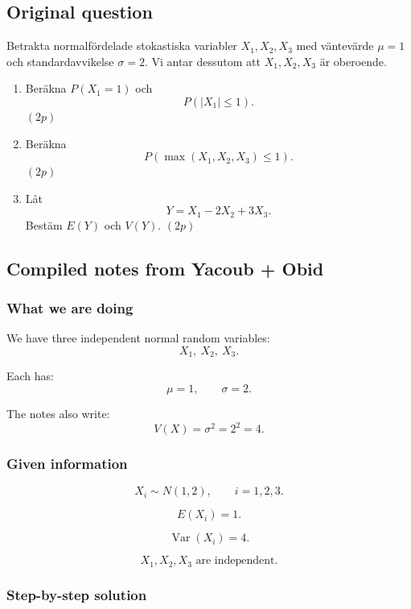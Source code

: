 \documentclass[10pt]{article}
\begin{document}
\subsection*{Original question}

Betrakta normalfördelade stokastiska variabler
\(X_1,X_2,X_3\) med väntevärde \(\mu=1\) och
standardavvikelse \(\sigma=2\). Vi antar dessutom
att \(X_1,X_2,X_3\) är oberoende.

\begin{enumerate}[label=\alph*)]
\item Beräkna \(P(X_1=1)\) och
\[
P(|X_1|\le 1).
\]
\((2p)\)

\item Beräkna
\[
P(\max(X_1,X_2,X_3)\le 1).
\]
\((2p)\)

\item Låt
\[
Y=X_1-2X_2+3X_3.
\]
Bestäm \(E(Y)\) och \(V(Y)\). \((2p)\)
\end{enumerate}

\subsection*{Compiled notes from Yacoub + Obid}

\subsubsection*{What we are doing}

We have three independent normal random variables:
\[
X_1,\ X_2,\ X_3.
\]

Each has:
\[
\mu=1,
\qquad
\sigma=2.
\]

The notes also write:
\[
V(X)=\sigma^2=2^2=4.
\]

\subsubsection*{Given information}

\[
X_i\sim N(1,2),
\qquad
i=1,2,3.
\]

\[
E(X_i)=1.
\]

\[
\operatorname{Var}(X_i)=4.
\]

\[
X_1,X_2,X_3
\text{ are independent.}
\]

\subsubsection*{Step-by-step solution}
\end{document}
